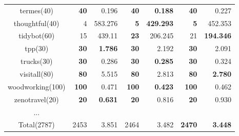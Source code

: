\begin{center}
\begin{tabular}{c rr rr rr}
    termes(40)      & \textbf{40}   & 0.196             & \textbf{40}   & \textbf{0.188}      & \textbf{40}   & 0.227 \\
    thoughtful(40)  & 4             & 583.276           & \textbf{5}    & \textbf{429.293}    & \textbf{5}    & 452.353 \\
    tidybot(60)     & 15            & 439.11            & \textbf{23}   & 206.245             & 21            & \textbf{194.346} \\
    tpp(30)         & \textbf{30}   & \textbf{1.786}    & \textbf{30}   & 2.192               & \textbf{30}   & 2.091 \\
    trucks(30)      & \textbf{30}   & 0.286             & \textbf{30}   & \textbf{0.285}      & \textbf{30}   & 0.324\\
    visitall(80)    & \textbf{80}   & 5.515             & \textbf{80}   & 2.813               & \textbf{80}   & \textbf{2.780} \\
    woodworking(100)& \textbf{100}  & 0.471             & \textbf{100}  & \textbf{0.423}      & \textbf{100}  & 0.462 \\
    zenotravel(20)  & \textbf{20}   & \textbf{0.631}    & \textbf{20}   & 0.816               & \textbf{20}   & 0.930 \\
    ...\\
    \midrule
    Total(2787) & 2453 & 3.851 & 2464 & 3.482 & \textbf{2470} & \textbf{3.448} \\
    \bottomrule
 \end{tabular}
\end{center}

\begin{figure}
  
\end{figure}